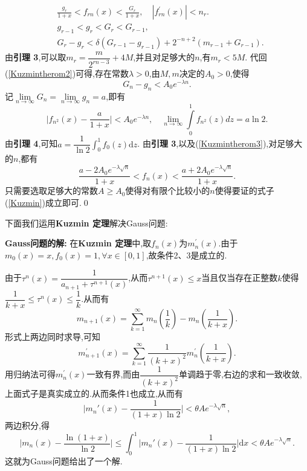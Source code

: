 \begin{equation}\label{Kuzmintherom2}\begin{aligned}
         & \frac{g_r}{1+x}<f_{rn}(x)<\frac{G_r}{1+x},\quad |f_{rn}^{\prime}(x)|<n_{r}. \\
         & g_{r-1}<g_{r}<G_{r}<G_{r-1},                                                \\
         & G_r-g_r<\delta(G_{r-1}-g_{r-1})+2^{-n+2}(m_{r-1}+G_{r-1}).
    \end{aligned}\end{equation}
由\textbf{引理 3},可以取$m_r = \dfrac{m}{2^{rn-3}} + 4M$,并且对足够大的$n$,有$m_r<5M$.
代回(\ref{Kuzmintherom2})可得,存在常数$\lambda>0$,由$M,m$决定的$A_0>0$,使得
$$G_n-g_n<A_0e^{-\lambda n}.$$
记$\lim\limits_{n\to\infty}G_n=\lim\limits_{n\to\infty}g_n=a$,即有
\begin{equation}\label{Kuzmintherom3}
    \Big|f_{n^2}(x)-\frac{a}{1+x}\Big|<A_0 e^{-\lambda n},\quad \lim_{n\to\infty} \int\limits_0^1f_{n^2}(z)dz=a\ln2.
\end{equation}
由\textbf{引理 4},可知$a=\dfrac{1}{\ln2}\int_{0}^{1}f_0(z)\mathrm{d}z$.
由\textbf{引理 3},以及(\ref{Kuzmintherom3}),对足够大的$n$,都有
$$\frac{a-2A_0 e^{-\lambda\sqrt{n}}}{1+x}<f_{n}(x)<\frac{a+2A_0 e^{-\lambda\sqrt{n}}}{1+x}.$$
只需要选取足够大的常数$A\geqslant A_0$使得对有限个比较小的$n$使得要证的式子(\ref{Kuzmin})成立即可.\qed
\par
\par
下面我们运用\textbf{Kuzmin 定理}解决Gauss问题:\par
\textbf{Gauss问题的解}\textsuperscript{\cite{Kuzmin,Khinchin,Iosifescu}}\textbf{:  }
在\textbf{Kuzmin 定理}中,取$f_n(x)$为$m^{'}_n(x)$.由于$m_0(x)=x,f_0(x)=1,\forall x\in[0,1]$,故条件2、3是成立的.\par
由于$\tau^{n}(x)=\dfrac{1}{a_{n+1}+\tau^{n+1}(x)}$,从而$\tau^{n+1}(x)\leqslant x$当且仅当存在正整数$k$使得$\dfrac{1}{k+x}\leqslant\tau^{n}(x)\leqslant\dfrac{1}{k}$.从而有
$$m_{n+1}(x)=\sum_{k=1}^{\infty}m_n\left(\frac{1}{k}\right)-m_n\left(\frac{1}{k+x}\right).$$
形式上两边同时求导,可知
$$m_{n+1}^{\prime}(x)=\sum_{k=1}^{\infty}\frac{1}{(k+x)^2}m_n^{\prime}\left(\frac{1}{k+x}\right).$$
用归纳法可得$m^{'}_n(x)$一致有界,而由$\dfrac{1}{(k+x)^2}$单调趋于零,右边的求和一致收敛,上面式子是真实成立的.从而条件1也成立,从而有
$$\Big|m_n'(x)-\frac{1}{(1+x)\ln2}\Big|<\theta Ae^{-\lambda \sqrt{n}},$$
两边积分,得
$$\Big|m_n(x)-\frac{\ln{(1+x)}}{\ln{2}}\Big|\leqslant\int_0^1\Big|m_n'(x)-\frac{1}{(1+x)\ln2}\Big|\mathrm{d}x<\theta Ae^{-\lambda \sqrt{n}}.$$
这就为Gauss问题给出了一个解.


